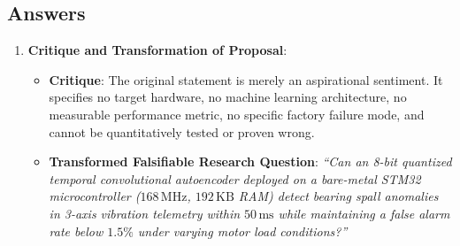 \subsection*{Answers}

\begin{enumerate}
    \item \textbf{Critique and Transformation of Proposal}:
    \begin{itemize}
        \item \textbf{Critique}: The original statement is merely an aspirational sentiment. It specifies no target hardware, no machine learning architecture, no measurable performance metric, no specific factory failure mode, and cannot be quantitatively tested or proven wrong.
        \item \textbf{Transformed Falsifiable Research Question}: \emph{``Can an 8-bit quantized temporal convolutional autoencoder deployed on a bare-metal STM32 microcontroller ($168\,\text{MHz}$, $192\,\text{KB}$ RAM) detect bearing spall anomalies in 3-axis vibration telemetry within $50\,\text{ms}$ while maintaining a false alarm rate below $1.5\%$ under varying motor load conditions?''}
    \end{itemize}


\end{enumerate}
